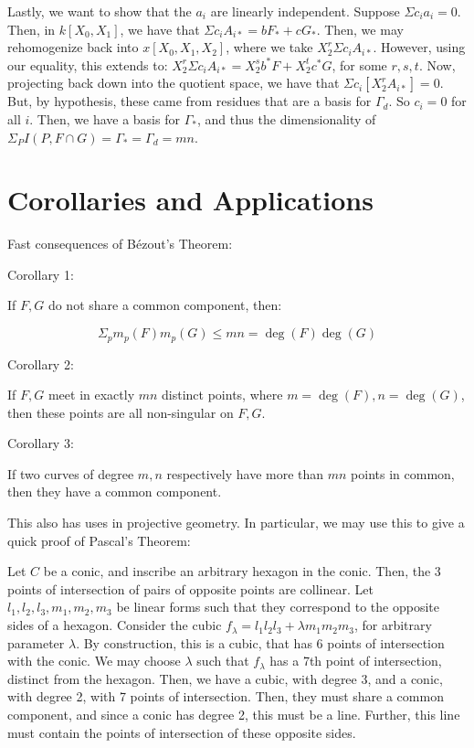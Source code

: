 \documentclass[10pt]{article}
\begin{document}
Lastly, we want to show that the $a_i$ are linearly independent. Suppose $\Sigma c_i a_i = 0$. Then, in $k[X_0,X_1]$, we have that $\Sigma c_i A_{i*} = b F_* + c G_*$. Then, we may rehomogenize back into $x[X_0,X_1,X_2]$, where we take $X_2^r \Sigma c_i A_{i*}$. However, using our equality, this extends to: $X_2^r \Sigma c_i A_{i*} = X_2^s b^* F + X_2^ t c^* G$, for some $r,s,t$. Now, projecting back down into the quotient space, we have that $\Sigma c_i [ X_2^rA_{i*}] = 0$. But, by hypothesis, these came from residues that are a basis for $\Gamma_d$. So $c_i = 0$ for all $i$. Then, we have a basis for $\Gamma_*$, and thus the dimensionality of $\Sigma_P I(P,F \cap G) = \Gamma_* = \Gamma_d = mn$.

\section{Corollaries and Applications}

Fast consequences of B\'ezout's Theorem:

Corollary 1:

If $F,G$ do not share a common component, then:

$$ \Sigma_p m_p(F) m_p(G) \leq mn = \deg(F) \deg(G) $$

Corollary 2:

If $F,G$ meet in exactly $mn$ distinct points, where $m = \deg(F), n = \deg(G)$, then these points are all non-singular on $F,G$.

Corollary 3:

If two curves of degree $m,n$ respectively have more than $mn$ points in common, then they have a common component.

This also has uses in projective geometry. In particular, we may use this to give a quick proof of Pascal's Theorem:

Let $C$ be a conic, and inscribe an arbitrary hexagon in the conic. Then, the 3 points of intersection of pairs of opposite points are collinear. Let $l_1, l_2, l_3, m_1, m_2, m_3$ be linear forms such that they correspond to the opposite sides of a hexagon. Consider the cubic $f_\lambda = l_1 l_2 l_3 + \lambda m_1 m_2 m_3$, for arbitrary parameter $\lambda$. By construction, this is a cubic, that has 6 points of intersection with the conic. We may choose $\lambda$ such that $f_\lambda$ has a 7th point of intersection, distinct from the hexagon. Then, we have a cubic, with degree 3, and a conic, with degree 2, with 7 points of intersection. Then, they must share a common component, and since a conic has degree 2, this must be a line. Further, this line must contain the points of intersection of these opposite sides.
\end{document}
